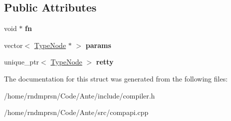 \subsection*{Public Attributes}
\begin{DoxyCompactItemize}
\item 
\mbox{\label{structCtFunc_a437e6ae14e5898ed878a5b9e0fd04dba}} 
void $\ast$ {\bfseries fn}
\item 
\mbox{\label{structCtFunc_a933a843cc3ce4f6392c57ec9bec5417f}} 
vector$<$ \hyperlink{structTypeNode}{Type\+Node} $\ast$ $>$ {\bfseries params}
\item 
\mbox{\label{structCtFunc_af23e2c315c2c2dbfce82827763315e40}} 
unique\+\_\+ptr$<$ \hyperlink{structTypeNode}{Type\+Node} $>$ {\bfseries retty}
\end{DoxyCompactItemize}


The documentation for this struct was generated from the following files\+:\begin{DoxyCompactItemize}
\item 
/home/rndmprsn/\+Code/\+Ante/include/compiler.\+h\item 
/home/rndmprsn/\+Code/\+Ante/src/compapi.\+cpp\end{DoxyCompactItemize}
